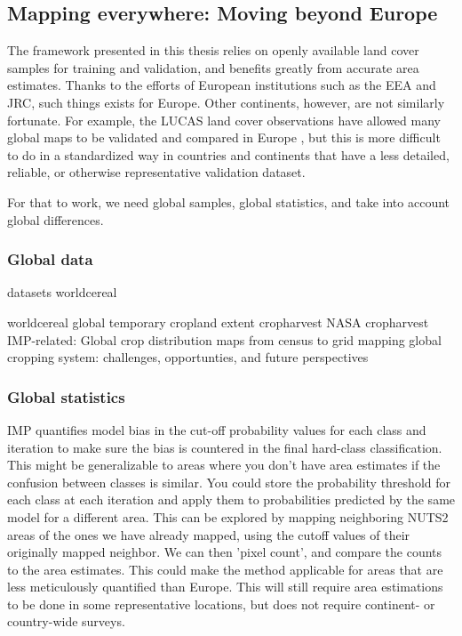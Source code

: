     \subsection{Mapping everywhere: Moving beyond Europe}

        The framework presented in this thesis relies on openly available land cover samples for training and validation, and benefits greatly from accurate area estimates. Thanks to the efforts of European institutions such as the EEA and JRC, such things exists for Europe. Other continents, however, are not similarly fortunate. For example, the LUCAS land cover observations \citep{dandrimont2020harmonised} have allowed many global maps to be validated and compared in Europe \citep{gao2020consistency,venter2022global}, but this is more difficult to do in a standardized way in countries and continents that have a less detailed, reliable, or otherwise representative validation dataset.
        
        For that to work, we need global samples, global statistics, and take into account global differences.
        
        \subsubsection{Global data}
        
        datasets
        worldcereal \citep{boogaard2023worldcereal}

        worldcereal global temporary cropland extent \citep{lesiv2023global} %
        cropharvest
        NASA cropharvest \citep{tseng2021cropharvest} %
        IMP-related: Global crop distribution maps from census to grid \citep{you2014generating}
        mapping global cropping system: challenges, opportunties, and future perspectives \citep{you2022mapping}

        \subsubsection{Global statistics}

        IMP quantifies model bias in the cut-off probability values for each class and iteration to make sure the bias is countered in the final hard-class classification. This might be generalizable to areas where you don't have area estimates if the confusion between classes is similar. You could store the probability threshold for each class at each iteration and apply them to probabilities predicted by the same model for a different area. This can be explored by mapping neighboring NUTS2 areas of the ones we have already mapped, using the cutoff values of their originally mapped neighbor. We can then 'pixel count', and compare the counts to the area estimates. This could make the method applicable for areas that are less meticulously quantified than Europe. This will still require area estimations to be done in some representative locations, but does not require continent- or country-wide surveys.
        
